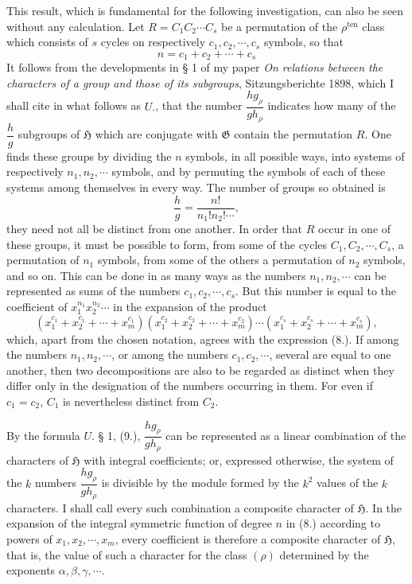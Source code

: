 \documentclass[11pt]{article}
\newcommand{\Hgr}{\mathfrak{H}}
\newcommand{\Ggr}{\mathfrak{G}}
\newcommand{\ten}{\mathrm{ten}}
\begin{document}
This result, which is fundamental for the following investigation, can also be seen without any calculation. Let $R=C_1C_2\cdots C_s$ be a permutation of the $\rho^{\ten}$ class which consists of $s$ cycles on respectively $c_1,c_2,\cdots,c_s$ symbols, so that
\begin{equation}\tag{9.}
 n=c_1+c_2+\cdots+c_s
\end{equation}
It follows from the developments in § 1 of my paper \emph{On relations between the characters of a group and those of its subgroups}, Sitzungsberichte 1898, which I shall cite in what follows as $U.$, that the number $\dfrac{h g_\rho}{g h_\rho}$ indicates how many of the $\dfrac{h}{g}$ subgroups of $\Hgr$ which are conjugate with $\Ggr$ contain the permutation $R$. One finds these groups by dividing the $n$ symbols, in all possible ways, into systems of respectively $n_1,n_2,\cdots$ symbols, and by permuting the symbols of each of these systems among themselves in every way. The number of groups so obtained is
\[
 \frac{h}{g}=\frac{n!}{n_1!n_2!\cdots},
\]
they need not all be distinct from one another. In order that $R$ occur in one of these groups, it must be possible to form, from some of the cycles $C_1,C_2,\cdots,C_s$, a permutation of $n_1$ symbols, from some of the others a permutation of $n_2$ symbols, and so on. This can be done in as many ways as the numbers $n_1,n_2,\cdots$ can be represented as sums of the numbers $c_1,c_2,\cdots,c_s$. But this number is equal to the coefficient of $x_1^{n_1}x_2^{n_2}\cdots$ in the expansion of the product
\begin{equation}\tag{10.}
 (x_1^{c_1}+x_2^{c_1}+\cdots+x_m^{c_1})(x_1^{c_2}+x_2^{c_2}+\cdots+x_m^{c_2})\cdots
 (x_1^{c_s}+x_2^{c_s}+\cdots+x_m^{c_s}),
\end{equation}
which, apart from the chosen notation, agrees with the expression (8.). If among the numbers $n_1,n_2,\cdots$, or among the numbers $c_1,c_2,\cdots$, several are equal to one another, then two decompositions are also to be regarded as distinct when they differ only in the designation of the numbers occurring in them. For even if $c_1=c_2$, $C_1$ is nevertheless distinct from $C_2$.

By the formula $U.$ § 1, (9.), $\dfrac{h g_\rho}{g h_\rho}$ can be represented as a linear combination of the characters of $\Hgr$ with integral coefficients; or, expressed otherwise, the system of the $k$ numbers $\dfrac{h g_\rho}{g h_\rho}$ is divisible by the module formed by the $k^2$ values of the $k$ characters. I shall call every such combination a composite character of $\Hgr$. In the expansion of the integral symmetric function of degree $n$ in (8.) according to powers of $x_1,x_2,\cdots,x_m$, every coefficient is therefore a composite character of $\Hgr$, that is, the value of such a character for the class $(\rho)$ determined by the exponents $\alpha,\beta,\gamma,\cdots$.
\end{document}

